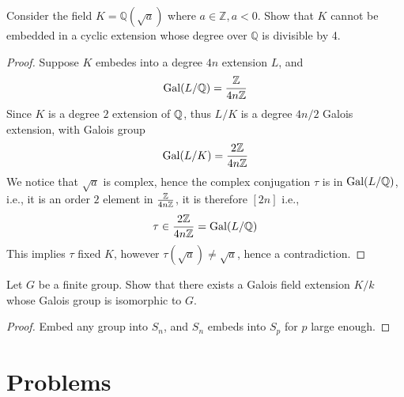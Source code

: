 \begin{prob}[S2009-Q3]
    Consider the field \(K = \mathbb{Q}(\sqrt{a})\) where \(a \in \mathbb{Z}, a < 0\). Show that \(K\) cannot be embedded in a cyclic extension whose degree over \(\mathbb{Q}\) is divisible by 4.
\end{prob}
\begin{proof}
    Suppose $K$ embedes into a degree $4n$ extension $L$, and 
    \begin{equation*}
        \text{Gal}(L/\mathbb{Q})=\frac{\mathbb{Z}}{4n\mathbb{Z}}
    \end{equation*} 
    Since $K$ is a degree $2$ extension of $\mathbb{Q}$, thus $L/K$ is a degree $4n/2$ Galois extension, with Galois group 
    \begin{equation*}
        \text{Gal}(L/K)=\frac{2\mathbb{Z}}{4n\mathbb{Z}}
    \end{equation*}
    We notice that $\sqrt{a}$ is complex, hence the complex conjugation $\tau$ is in $\text{Gal}(L/\mathbb{Q})$, i.e., it is an order $2$ element in $\frac{\mathbb{Z}}{4n\mathbb{Z}}$, it is therefore $[2n]$ i.e., 
    \begin{equation*}
        \tau\in\frac{2\mathbb{Z}}{4n\mathbb{Z}}=\text{Gal}(L/\mathbb{Q})
    \end{equation*}
    This implies $\tau$ fixed $K$, however $\tau(\sqrt{a})\neq\sqrt{a}$, hence a contradiction.
\end{proof}


\begin{prob}[F2000-Q4]
    Let \(G\) be a finite group. Show that there exists a Galois field extension \(K/k\) whose Galois group is isomorphic to \(G\).
\end{prob}
\begin{proof}
    Embed any group into $S_n$, and $S_n$ embeds into $S_p$ for $p$ large enough. 
\end{proof}


\section{Problems}


